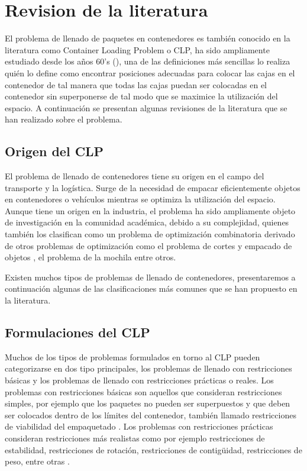 \documentclass[openany]{article}
\begin{document}
\section{Revision de la literatura}

El problema de llenado de paquetes en contenedores es también conocido en la literatura como Container Loading Problem o CLP, ha sido ampliamente estudiado desde los años 60's (\textcite{barnett1967exact}), una de las definiciones más sencillas lo realiza \textcite{GEORGE1980147} quién lo define como encontrar posiciones adecuadas para colocar las cajas en el contenedor de tal manera que todas las cajas puedan ser colocadas en el contenedor sin superponerse de tal modo que se maximice la utilización del espacio. A continuación se presentan algunas revisiones de la literatura que se han realizado sobre el problema.

\subsection{Origen del CLP}

El problema de llenado de contenedores tiene su origen en el campo del transporte y la logística. Surge de la necesidad de empacar eficientemente objetos en contenedores o vehículos mientras se optimiza la utilización del espacio. Aunque tiene un origen en la industria, el problema ha sido ampliamente objeto de investigación en la comunidad académica, debido a su complejidad, quienes también los clasifican como un problema de optimización combinatoria derivado de otros problemas de optimización como el problema de cortes y empacado de objetos \parencite{Alvarez-Valdes2018}, el problema de la mochila \textcite{DEQUEIROZ2012200} entre otros.

Existen muchos tipos de problemas de llenado de contenedores, presentaremos a continuación algunas de las clasificaciones más comunes que se han propuesto en la literatura.

\subsection{Formulaciones del CLP}

Muchos de los tipos de problemas formulados en torno al CLP pueden categorizarse en dos tipo principales, los problemas de llenado con restricciones básicas y los problemas de llenado con restricciones prácticas o reales. Los problemas con restricciones básicas son aquellos que consideran restricciones simples, por ejemplo que los paquetes no pueden ser superpuestos y que deben ser colocados dentro de los límites del contenedor, también llamado restricciones de viabilidad del empaquetado \parencite{scheithauer2017introduction}. Los problemas con restricciones prácticas consideran restricciones más realistas como por ejemplo restricciones de estabilidad, restricciones de rotación, restricciones de contigüidad, restricciones de peso, entre otras \parencite{KURPEL202087}.
\end{document}
